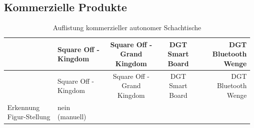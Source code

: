 \hypertarget{kommerzielle-produkte}{%
\subsection{Kommerzielle Produkte}\label{kommerzielle-produkte}}

\pagebreak

\begin{longtable}[]{@{}llccr@{}}
\caption{Auflistung kommerzieller autonomer Schachtische
\label{commchesstables}}\tabularnewline
\toprule
\begin{minipage}[b]{0.19\columnwidth}\raggedright
\strut
\end{minipage} & \begin{minipage}[b]{0.19\columnwidth}\raggedright
Square Off - Kingdom\strut
\end{minipage} & \begin{minipage}[b]{0.20\columnwidth}\centering
Square Off - Grand Kingdom\strut
\end{minipage} & \begin{minipage}[b]{0.15\columnwidth}\centering
DGT Smart Board\strut
\end{minipage} & \begin{minipage}[b]{0.13\columnwidth}\raggedleft
DGT Bluetooth Wenge\strut
\end{minipage}\tabularnewline
\midrule
\endfirsthead
\toprule
\begin{minipage}[b]{0.19\columnwidth}\raggedright
\strut
\end{minipage} & \begin{minipage}[b]{0.19\columnwidth}\raggedright
Square Off - Kingdom\strut
\end{minipage} & \begin{minipage}[b]{0.20\columnwidth}\centering
Square Off - Grand Kingdom\strut
\end{minipage} & \begin{minipage}[b]{0.15\columnwidth}\centering
DGT Smart Board\strut
\end{minipage} & \begin{minipage}[b]{0.13\columnwidth}\raggedleft
DGT Bluetooth Wenge\strut
\end{minipage}\tabularnewline
\midrule
\endhead
\begin{minipage}[t]{0.19\columnwidth}\raggedright
Erkennung Figur-Stellung\strut
\end{minipage} & \begin{minipage}[t]{0.19\columnwidth}\raggedright
nein (manuell)\strut
\end{minipage} & \begin{minipage}[t]{0.20\columnwidth}\centering

\end{minipage}
\end{longtable}
